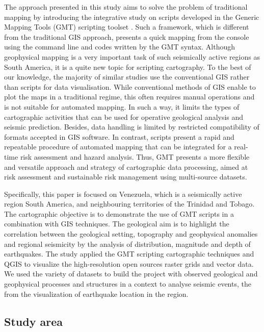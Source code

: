 \documentclass[sustainability,article,submit,pdftex,moreauthors]{Definitions/mdpi}
\begin{document}
The approach presented in this study aims to solve the problem of traditional mapping by introducing the integrative study on scripts developed in the Generic Mapping Tools (GMT) scripting toolset \cite{Wessel}. Such a framework, which is different from the traditional GIS approach, presents a quick mapping from the console using the command line and codes written by the GMT syntax. Although geophysical mapping is a very important task of such seismically active regions as South America, it is a quite new topic for scripting cartography. To the best of our knowledge, the majority of similar studies use the conventional GIS rather than scripts for data visualisation. While conventional methods of GIS enable to plot the maps in a traditional regime, this often requires manual operations and is not suitable for automated mapping. In such a way, it limits the types of cartographic activities that can be used for operative geological analysis and seismic prediction. Besides, data handling is limited by restricted compatibility of formats accepted in GIS software. In contrast, scripts present a rapid and repeatable procedure of automated mapping that can be integrated for a real-time risk assessment and hazard analysis. Thus, GMT presents a more flexible and versatile approach and strategy of cartographic data processing, aimed at risk assessment and sustainable risk management using multi-source datasets. 

Specifically, this paper is focused on Venezuela, which is a seismically active region South America, and neighbouring territories of the Trinidad and Tobago. The cartographic objective is to demonstrate the use of GMT scripts in a combination with GIS techniques. The geological aim is to highlight the correlation between the geological setting, topography and geophysical anomalies and regional seismicity by the analysis of distribution, magnitude and depth of earthquakes. The study applied the GMT scripting cartographic techniques and QGIS to visualize the high-resolution open sources raster grids and vector data. We used the variety of datasets to build the project with observed geological and geophysical processes and structures in a context to analyse seismic events, the from the visualization of earthquake location in the region. 

\subsection{Study area}
\end{document}
